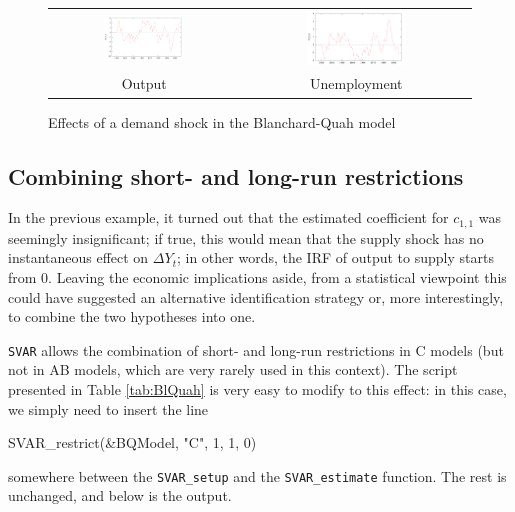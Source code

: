 \documentclass[a4paper,10pt]{article}
\newcounter{script}[section]
\begin{document}
\begin{figure}[hbtp]
  \centering
  \begin{tabular}{cc}
    \includegraphics[width=0.45\textwidth]{bqhdy} &
    \includegraphics[width=0.45\textwidth]{bqhdu} \\
    Output & Unemployment
  \end{tabular}
  \caption{Effects of a demand shock in the Blanchard-Quah model}
  \label{fig:BlQuah-HD-Output}
\end{figure}

\subsection{Combining short- and long-run restrictions}
\label{sec:C-combined}

In the previous example, it turned out that the estimated coefficient
for $c_{1,1}$ was seemingly insignificant; if true, this would mean
that the supply shock has no instantaneous effect on $\Delta Y_t$; in
other words, the IRF of output to supply starts from 0. Leaving the
economic implications aside, from a statistical viewpoint this could
have suggested an alternative identification strategy or, more
interestingly, to combine the two hypotheses into one. 

\texttt{SVAR} allows the combination of short- and long-run 
restrictions in C models (but not in AB models, which are very rarely used 
in this context). The script presented in Table \ref{tab:BlQuah} is very easy to modify
to this effect: in this case, we simply need to insert the line 
\begin{code}
  SVAR_restrict(&BQModel, "C", 1, 1, 0)
\end{code}
somewhere between the \texttt{SVAR\_setup} and the
\texttt{SVAR\_estimate} function. 
The rest is unchanged, and below is the output.
\end{document}
